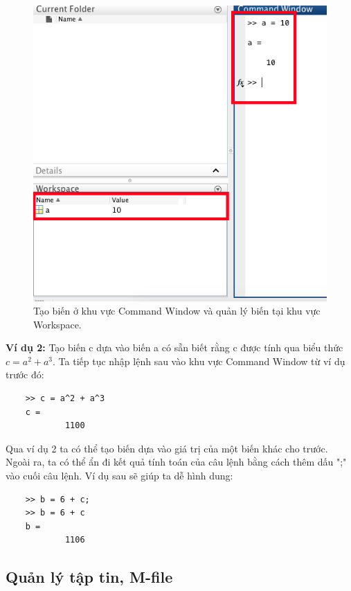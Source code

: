 \documentclass[12pt,a4paper]{article}
\begin{document}
\begin{center}
	\begin{figure}[htp]
		\begin{center}
		\includegraphics[scale=.5]{hinhtieuluan/pic4}
		\end{center}
		\caption{Tạo biến ở khu vực Command Window và quản lý biến tại khu vực Workspace.}
		\label{refhinh4}
	\end{figure}
\end{center}
\textbf{Ví dụ 2:} Tạo biến c dựa vào biến a có sẵn biết rằng c được tính qua biểu thức $c=a^2+a^3$. Ta tiếp tục nhập lệnh sau vào khu vực Command Window từ ví dụ trước đó:
\begin{lstlisting}
	>> c = a^2 + a^3
	c =
        	1100
\end{lstlisting}
Qua ví dụ 2 ta có thể tạo biến dựa vào giá trị của một biến khác cho trước. Ngoài ra, ta có thể ẩn đi kết quả tính toán của câu lệnh bằng cách thêm dấu ";" vào cuối câu lệnh. Ví dụ sau sẽ giúp ta dễ hình dung:
\begin{lstlisting}
	>> b = 6 + c;
	>> b = 6 + c
	b =
        	1106
\end{lstlisting}

\subsection{Quản lý tập tin, M-file}
\end{document}

